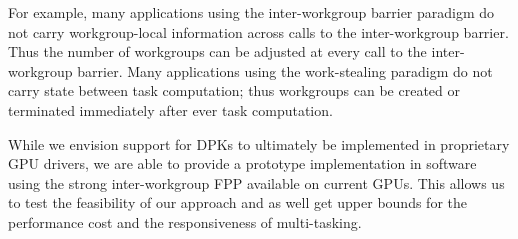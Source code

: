 \documentclass[nocopyrightspace]{sigplanconf-pldi16}
\begin{document}
For example, many applications using the inter-workgroup barrier
paradigm do not carry workgroup-local information across calls to the
inter-workgroup barrier. Thus the number of workgroups can be adjusted
at every call to the inter-workgroup barrier. Many applications using
the work-stealing paradigm do not carry state between task
computation; thus workgroups can be created or terminated immediately
after ever task computation.

While we envision support for DPKs to ultimately be implemented in
proprietary GPU drivers, we are able to provide a prototype
implementation in software using the strong inter-workgroup FPP
available on current GPUs. This allows us to test the feasibility of
our approach and as well get upper bounds for the performance cost and
the responsiveness of multi-tasking.
\end{document}
